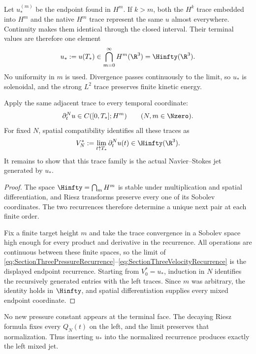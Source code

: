 Let \(u_*^{(m)}\) be the endpoint found in \(H^m\).  If \(k>m\), both the
\(H^k\) trace embedded into \(H^m\) and the native \(H^m\) trace represent the
same \(u\) almost everywhere.  Continuity makes them identical through the
closed interval.  Their terminal values are therefore one element
\begin{equation}\label{eq:SectionThreeCommonEndpoint}
  u_*:=u(T_*)
  \in\bigcap_{m=0}^{\infty}H^m(\R^3)
  =\Hinfty(\R^3).
\end{equation}
No uniformity in \(m\) is used.  Divergence passes continuously to the limit,
so \(u_*\) is solenoidal, and the strong \(L^2\) trace preserves finite kinetic
energy.

Apply the same adjacent trace to every temporal coordinate:
\[
  \partial_t^N u\in C([0,T_*];H^m)
  \qquad(N,m\in\Nzero).
\]
For fixed \(N\), spatial compatibility identifies all these traces as
\begin{equation}\label{eq:SectionThreeVelocityJetTraces}
  V_N^*
  :=\lim_{t\uparrow T_*}\partial_t^N u(t)
  \in\Hinfty(\R^3).
\end{equation}
It remains to show that this trace family is the actual Navier--Stokes jet
generated by \(u_*\).


\begin{proof}
The space \(\Hinfty=\bigcap_mH^m\) is stable under multiplication and spatial
differentiation, and Riesz transforms preserve every one of its Sobolev
coordinates.  The two recurrences therefore determine a unique next pair at
each finite order.

Fix a finite target height \(m\) and take the trace convergence in a Sobolev
space high enough for every product and derivative in the recurrence.  All
operations are continuous between these finite spaces, so the limit of
\eqref{eq:SectionThreePressureRecurrence}--\eqref{eq:SectionThreeVelocityRecurrence}
is the displayed endpoint recurrence.  Starting from \(V_0^*=u_*\), induction
in \(N\) identifies the recursively generated entries with the left traces.
Since \(m\) was arbitrary, the identity holds in \(\Hinfty\), and spatial
differentiation supplies every mixed endpoint coordinate.
\end{proof}

No new pressure constant appears at the terminal face.  The decaying Riesz
formula fixes every \(Q_N(t)\) on the left, and the limit preserves that
normalization.  Thus inserting \(u_*\) into the normalized recurrence produces
exactly the left mixed jet.
